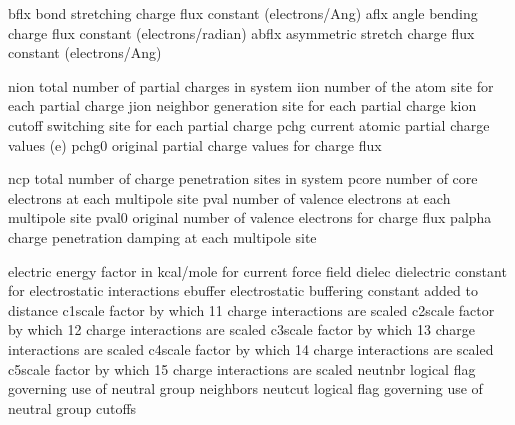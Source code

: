 \documentclass[letterpaper,11pt,english]{sphinxmanual}
\begin{document}

\begin{sphinxVerbatim}[commandchars=\\\{\}]
bflx            bond stretching charge flux constant (electrons/Ang)
aflx            angle bending charge flux constant (electrons/radian)
abflx           asymmetric stretch charge flux constant (electrons/Ang)
\end{sphinxVerbatim}


\begin{sphinxVerbatim}[commandchars=\\\{\}]
nion            total number of partial charges in system
iion            number of the atom site for each partial charge
jion            neighbor generation site for each partial charge
kion            cutoff switching site for each partial charge
pchg            current atomic partial charge values (e\PYGZhy{})
pchg0           original partial charge values for charge flux
\end{sphinxVerbatim}


\begin{sphinxVerbatim}[commandchars=\\\{\}]
ncp             total number of charge penetration sites in system
pcore           number of core electrons at each multipole site
pval            number of valence electrons at each multipole site
pval0           original number of valence electrons for charge flux
palpha          charge penetration damping at each multipole site
\end{sphinxVerbatim}


\begin{sphinxVerbatim}[commandchars=\\\{\}]
electric        energy factor in kcal/mole for current force field
dielec          dielectric constant for electrostatic interactions
ebuffer         electrostatic buffering constant added to distance
c1scale         factor by which 1\PYGZhy{}1 charge interactions are scaled
c2scale         factor by which 1\PYGZhy{}2 charge interactions are scaled
c3scale         factor by which 1\PYGZhy{}3 charge interactions are scaled
c4scale         factor by which 1\PYGZhy{}4 charge interactions are scaled
c5scale         factor by which 1\PYGZhy{}5 charge interactions are scaled
neutnbr         logical flag governing use of neutral group neighbors
neutcut         logical flag governing use of neutral group cutoffs
\end{sphinxVerbatim}
\end{document}
